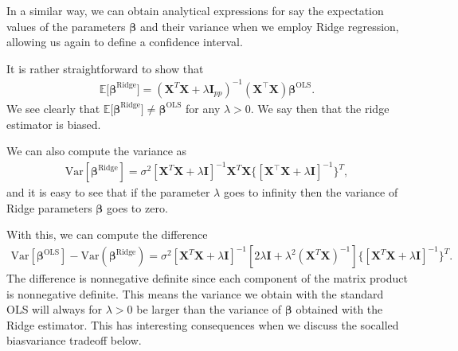 \documentclass[letterpaper,10pt,english]{sphinxmanual}
\begin{document}
In a similar way, we can obtain analytical expressions for say the
expectation values of the parameters \(\boldsymbol{\beta}\) and their variance
when we employ Ridge regression, allowing us again to define a confidence interval.

It is rather straightforward to show that
\begin{equation*}
\begin{split}
\mathbb{E} \big[ \boldsymbol{\beta}^{\mathrm{Ridge}} \big]=(\mathbf{X}^{T} \mathbf{X} + \lambda \mathbf{I}_{pp})^{-1} (\mathbf{X}^{\top} \mathbf{X})\boldsymbol{\beta}^{\mathrm{OLS}}.
\end{split}
\end{equation*}
We see clearly that
\(\mathbb{E} \big[ \boldsymbol{\beta}^{\mathrm{Ridge}} \big] \not= \boldsymbol{\beta}^{\mathrm{OLS}}\) for any \(\lambda > 0\). We say then that the ridge estimator is biased.

We can also compute the variance as
\begin{equation*}
\begin{split}
\mbox{Var}[\boldsymbol{\beta}^{\mathrm{Ridge}}]=\sigma^2[  \mathbf{X}^{T} \mathbf{X} + \lambda \mathbf{I} ]^{-1}  \mathbf{X}^{T} \mathbf{X} \{ [  \mathbf{X}^{\top} \mathbf{X} + \lambda \mathbf{I} ]^{-1}\}^{T},
\end{split}
\end{equation*}
and it is easy to see that if the parameter \(\lambda\) goes to infinity then the variance of Ridge parameters \(\boldsymbol{\beta}\) goes to zero.

With this, we can compute the difference
\begin{equation*}
\begin{split}
\mbox{Var}[\boldsymbol{\beta}^{\mathrm{OLS}}]-\mbox{Var}(\boldsymbol{\beta}^{\mathrm{Ridge}})=\sigma^2 [  \mathbf{X}^{T} \mathbf{X} + \lambda \mathbf{I} ]^{-1}[ 2\lambda\mathbf{I} + \lambda^2 (\mathbf{X}^{T} \mathbf{X})^{-1} ] \{ [  \mathbf{X}^{T} \mathbf{X} + \lambda \mathbf{I} ]^{-1}\}^{T}.
\end{split}
\end{equation*}
The difference is non\sphinxhyphen{}negative definite since each component of the
matrix product is non\sphinxhyphen{}negative definite.
This means the variance we obtain with the standard OLS will always for \(\lambda > 0\) be larger than the variance of \(\boldsymbol{\beta}\) obtained with the Ridge estimator. This has interesting consequences when we discuss the so\sphinxhyphen{}called bias\sphinxhyphen{}variance trade\sphinxhyphen{}off below.
\end{document}
